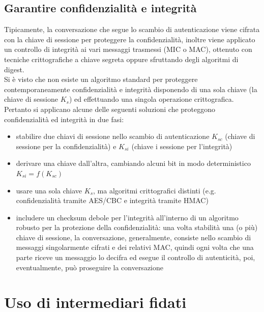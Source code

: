\subsection{Garantire confidenzialità e integrità}
Tipicamente, la conversazione che segue lo scambio di autenticazione viene cifrata con la chiave di sessione per proteggere la confidenzialità, inoltre viene applicato un controllo di integrità ai vari messaggi trasmessi (MIC o MAC), ottenuto con tecniche crittografiche a chiave segreta oppure sfruttando degli algoritmi di digest.\\
Si è visto che non esiste un algoritmo standard per proteggere contemporaneamente confidenzialità e integrità disponendo di una sola chiave (la chiave di sessione $K_{s}$) ed effettuando una singola operazione crittografica. Pertanto si applicano alcune delle seguenti soluzioni che proteggono confidenzialità ed integrità in due fasi:
\begin{itemize}
	\item stabilire due chiavi di sessione nello scambio di autenticazione $K_{sc}$ (chiave di sessione per la confidenzialità) e $K_{si}$ (chiave i sessione per l'integrità)
	\item derivare una chiave dall'altra, cambiando alcuni bit in modo deterministico $K_{si} = f(K_{sc})$
	\item usare una sola chiave $K_{s}$, ma algoritmi crittografici distinti (e.g. confidenzialità tramite AES/CBC e integrità tramite HMAC)
	\item includere un checksum debole per l'integrità all'interno di un algoritmo robusto per la protezione della confidenzialità: una volta stabilità una (o più) chiave di sessione, la conversazione, generalmente, consiste nello scambio di messaggi singolarmente cifrati e dei relativi MAC, quindi ogni volta che una parte riceve un messaggio lo decifra ed esegue il controllo di autenticità, poi, eventualmente, può proseguire la conversazione
\end{itemize}

\section{Uso di intermediari fidati}
